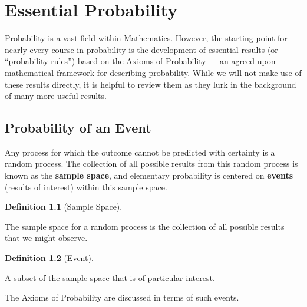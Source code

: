 \documentclass[
  letterpaper,
  DIV=11,
  numbers=noendperiod]{scrreprt}
\theoremstyle{definition}
\newtheorem{definition}{Definition}[chapter]
\theoremstyle{definition}
\theoremstyle{plain}
\theoremstyle{remark}
\begin{document}

\hypertarget{sec-fundamentals}{%
\chapter{Essential Probability}\label{sec-fundamentals}}

Probability is a vast field within Mathematics. However, the starting
point for nearly every course in probability is the development of
essential results (or ``probability rules'') based on the Axioms of
Probability --- an agreed upon mathematical framework for describing
probability. While we will not make use of these results directly, it is
helpful to review them as they lurk in the background of many more
useful results.

\hypertarget{probability-of-an-event}{%
\section{Probability of an Event}\label{probability-of-an-event}}

Any process for which the outcome cannot be predicted with certainty is
a random process. The collection of all possible results from this
random process is known as the \textbf{sample space}, and elementary
probability is centered on \textbf{events} (results of interest) within
this sample space.

\begin{definition}[Sample
Space]\protect\hypertarget{def-sample-space}{}\label{def-sample-space}

The sample space for a random process is the collection of all possible
results that we might observe.

\end{definition}

\begin{definition}[Event]\protect\hypertarget{def-event}{}\label{def-event}

A subset of the sample space that is of particular interest.

\end{definition}

The Axioms of Probability are discussed in terms of such events.
\end{document}
